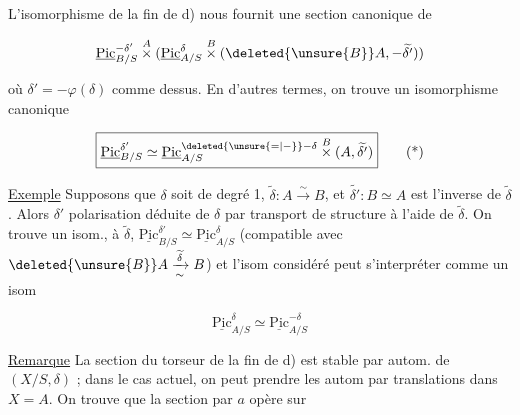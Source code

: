 L'isomorphisme de la fin de d) nous fournit une section canonique de

\[
\underline{\mathrm{Pic}}_{B/S}^{-\delta'}\overset A\times
(\underline{\mathrm{Pic}}^\delta_{A/S}\overset B\times(\deleted{\unsure{B}}A,-\widetilde{\delta'}))
\]

où $\delta'=-\varphi(\delta)$ comme dessus. En d'autres termes, on trouve un isomorphisme canonique

\[
\boxed{\underline{\mathrm{Pic}}^{\delta'}_{B/S}\simeq\underline{\mathrm{Pic}}^{\deleted{\unsure{=|-}}-\delta}_{A/S}\overset B\times(A,\widetilde{\delta'})}\tag*{(*)}
\]



\uline{Exemple} Supposons que $\delta$ soit de degré 1,  $\widetilde\delta:A\xrightarrow{\sim}B$, et $\widetilde{\delta'}:B\simeq A$ est l'inverse de $\widetilde\delta$. Alors $\delta'$   polarisation déduite de $\delta$ par transport de structure à l'aide de $\widetilde\delta$. On trouve un isom.,  à $\widetilde\delta$, $\underline{\mathrm{Pic}}^{\delta'}_{B/S}\simeq\underline{\mathrm{Pic}}^\delta_{A/S}$ (compatible  avec $\deleted{\unsure{B}}A\xrightarrow[\sim]{\widetilde\delta}B$) et l'isom considéré peut s'interpréter comme un isom 

\[
\underline{\mathrm{Pic}}^\delta_{A/S}\simeq\underline{\mathrm{Pic}}^{-\delta}_{A/S}
\]

  

\uline{Remarque} La section du torseur de la fin de d) est stable par autom. de $(X/S,\delta)$ ; dans le cas actuel, on peut prendre les autom par translations dans $X=A$. On trouve que la section par $a$ opère sur

